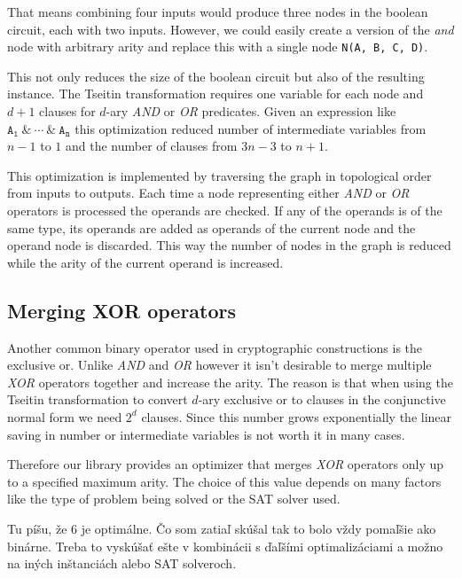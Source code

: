 That means combining four inputs would produce three nodes in the boolean circuit, each with two inputs.
However, we could easily create a version of the \emph{and} node with arbitrary arity and replace this with a single node \texttt{N(A, B, C, D)}.

This not only reduces the size of the boolean circuit but also of the resulting instance. 
The Tseitin transformation requires one variable for each node and $d+1$ clauses for $d$-ary \emph{AND} or \emph{OR} predicates.
Given an expression like $\texttt{A}_\texttt{1} ~\&~ \cdots ~\&~ \texttt{A}_\texttt{n}$ this optimization reduced number of intermediate variables from $n-1$ to $1$ and the number of clauses from $3n-3$ to $n+1$.

This optimization is implemented by traversing the graph in topological order from inputs to outputs.
Each time a node representing either \emph{AND} or \emph{OR} operators is processed the operands are checked.
If any of the operands is of the same type, its operands are added as operands of the current node and the operand node is discarded.
This way the number of nodes in the graph is reduced while the arity of the current operand is increased.

\subsection{Merging XOR operators}
Another common binary operator used in cryptographic constructions is the exclusive or.
Unlike \emph{AND} and \emph{OR} however it isn't desirable to merge multiple \emph{XOR} operators together and increase the arity.
The reason is that when using the Tseitin transformation to convert $d$-ary exclusive or to clauses in the conjunctive normal form we need $2^d$ clauses.
Since this number grows exponentially the linear saving in number or intermediate variables is not worth it in many cases.

Therefore our library provides an optimizer that merges \emph{XOR} operators only up to a specified maximum arity.
The choice of this value depends on many factors like the type of problem being solved or the SAT solver used.
\begin{framed}
\noindent Tu\citep{bard2007efficient} píšu, že 6 je optimálne. Čo som zatiaľ skúšal tak to bolo vždy pomaľšie ako binárne. Treba to vyskúšať ešte v kombinácii s ďaľšími optimalizáciami a možno na iných inštanciách alebo SAT solveroch.
\end{framed}

